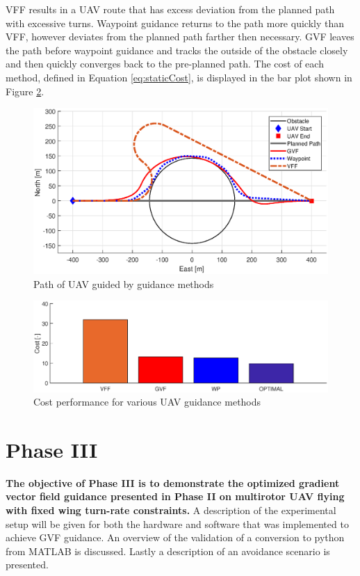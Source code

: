 \documentclass[numbered,pdftex]{ohio-etd}
\begin{document}
VFF results in a UAV route that has excess deviation from the planned path with excessive turns. Waypoint guidance returns to the path more quickly than VFF, however deviates from the planned path farther then necessary. GVF leaves the path before waypoint guidance and tracks the outside of the obstacle closely and then quickly converges back to the pre-planned path. The cost of each method, defined in Equation \ref{eq:staticCost}, is displayed in the bar plot shown in Figure \ref{fig:barplotperformance}.


\begin{figure}[H]
	\centering
	\includegraphics[trim=0 50 0 65,clip,width=15cm]{Figures/Simulations/compareMethods}
	\caption{Path of UAV guided by guidance methods}
	\label{fig:comparemethods}
\end{figure}


\begin{figure}[H]
	\centering
	\label{fig:barPlotCost}
	\includegraphics[width=15cm]{Figures/Simulations/barPlotPerformance}
	\caption{Cost performance for various UAV guidance methods}
	\label{fig:barplotperformance}
\end{figure}





\section{Phase III}
\textbf{The objective of Phase III is to demonstrate the optimized gradient vector field guidance presented in Phase II on multirotor UAV flying with fixed wing turn-rate constraints.} A description of the experimental setup will be given for both the hardware and software that was implemented to achieve GVF guidance. An overview of the validation of a conversion to python from MATLAB is discussed. Lastly a description of an avoidance scenario is presented.
\end{document}
